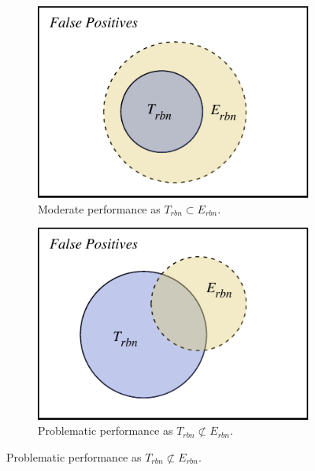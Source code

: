 \begin{figure}[p]
  \hspace{\fill}
  \\
  \bigskip
  \hspace{\fill}
  \begin{subfigure}[b]{0.475\textwidth}
    \includegraphics[width=\textwidth]{images/evaluation/set_explain/T_subset_of_E}
    \caption{Moderate performance as $T_{rbn} \subset E_{rbn}$.}
    \label{fig:evaluation:metrics:character_rec:sets:moderate}
  \end{subfigure}
  \hspace{\fill}
  \begin{subfigure}[b]{0.475\textwidth}
    \includegraphics[width=\textwidth]{images/evaluation/set_explain/E_not_subset_of_T}
    \caption{Problematic performance as $T_{rbn} \not\subset E_{rbn}$.}
    \label{fig:evaluation:metrics:character_rec:sets:problematic}

\end{subfigure}
\end{figure}
